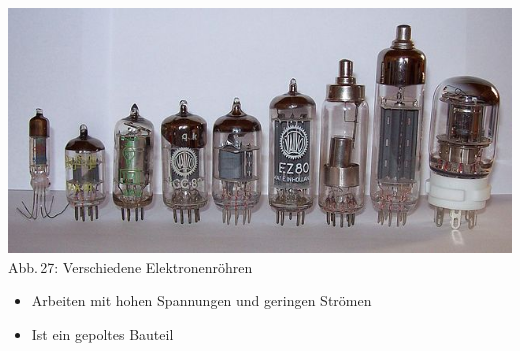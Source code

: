\begin{frame}
  \begin{center}
    \includegraphics[width=\textwidth,height=.5\textheight,keepaspectratio]{a06/Roehren.jpg}\\
    {\tiny Abb.\,27: Verschiedene Elektronenröhren~\cite{wmde}}
  \end{center}
  \begin{itemize}
    \item Arbeiten mit hohen Spannungen und geringen Strömen
    \item Ist ein gepoltes Bauteil
  \end{itemize}
\end{frame}

